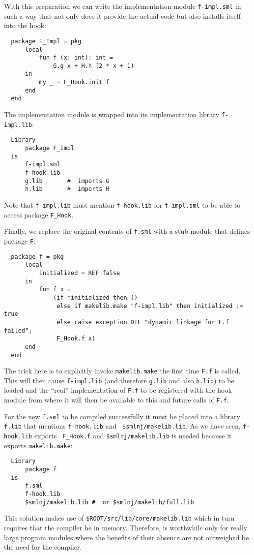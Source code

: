With this preparation we can write the implementation module {\tt f-impl.sml}
in such a way that not only does it provide the actual
code but also installs itself into the hook:
\begin{verbatim}
  package F_Impl = pkg
      local
          fun f (x: int): int =
              G.g x + H.h (2 * x + 1)
      in
          my _ = F_Hook.init f
      end
  end
\end{verbatim}
\noindent The implementation module is wrapped into its implementation
library {\tt f-impl.lib}:
\begin{verbatim}
  Library
      package F_Impl
  is
      f-impl.sml
      f-hook.lib
      g.lib       #  imports G 
      h.lib       #  imports H 
\end{verbatim}
\noindent Note that {\tt f-impl.lib} must mention {\tt f-hook.lib} for
{\tt f-impl.sml} to be able to access package {\tt F\_Hook}.

Finally, we replace the original contents of {\tt f.sml} with a stub
module that defines package {\tt F}:
\begin{verbatim}
  package f = pkg
      local
          initialized = REF false
      in
          fun f x =
              (if *initialized then ()
               else if makelib.make "f-impl.lib" then initialized := true
               else raise exception DIE "dynamic linkage for F.f failed";
               F_Hook.f x)
      end
  end
\end{verbatim}
\noindent The trick here is to explicitly invoke {\tt makelib.make} the
first time {\tt F.f} is called.  This will then cause {\tt f-impl.lib}
(and therefore {\tt g.lib} and also {\tt h.lib}) to be loaded and the
``real'' implementation of {\tt F.f} to be registered with the hook
module from where it will then be available to this and future calls
of {\tt F.f}.

For the new {\tt f.sml} to be compiled successfully it must be placed
into a library {\tt f.lib} that mentions {\tt f-hook.lib} and {\tt
\$smlnj/makelib.lib}.  As we have seen, {\tt f-hook.lib} exports {\tt
F\_Hook.f} and {\tt \$smlnj/makelib.lib} is needed because it exports
{\tt makelib.make}:

\begin{verbatim}
  Library
      package f
  is
      f.sml
      f-hook.lib
      $smlnj/makelib.lib #  or $smlnj/makelib/full.lib 
\end{verbatim}

  This solution makes use of {\tt \$ROOT/src/lib/core/makelib.lib}
which in turn requires that the compiler be in memory.  Therefore,
is worthwhile only for really large program modules where the benefits
of their absence are not outweighed be the need for the compiler.
